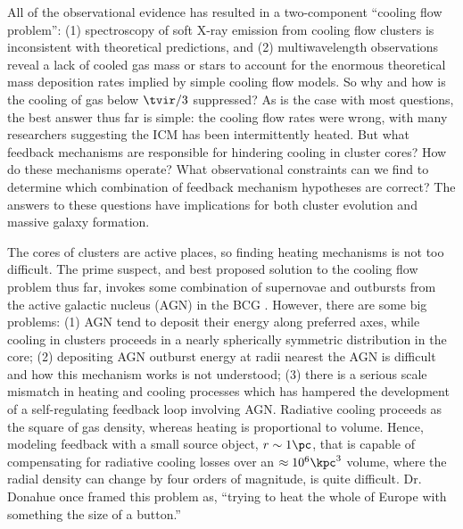 All of the observational evidence has resulted in a two-component
``cooling flow problem'': (1) spectroscopy of soft X-ray emission from
cooling flow clusters is inconsistent with theoretical predictions,
and (2) multiwavelength observations reveal a lack of cooled gas mass
or stars to account for the enormous theoretical mass deposition rates
implied by simple cooling flow models. So why and how is the cooling
of gas below $\tvir/3$ suppressed? As is the case with most questions,
the best answer thus far is simple: the cooling flow rates were wrong,
with many researchers suggesting the ICM has been intermittently
heated. But what feedback mechanisms are responsible for hindering
cooling in cluster cores?  How do these mechanisms operate?  What
observational constraints can we find to determine which combination
of feedback mechanism hypotheses are correct? The answers to these
questions have implications for both cluster evolution and massive
galaxy formation.

The cores of clusters are active places, so finding heating mechanisms
is not too difficult. The prime suspect, and best proposed solution to
the cooling flow problem thus far, invokes some combination of
supernovae and outbursts from the active galactic nucleus (AGN) in the
BCG \citep{1995MNRAS.276..663B, 1997MNRAS.288..355B,
2000ApJ...532...17L, 2001Natur.414..425V, 2002MNRAS.332..729C,
2002Natur.418..301B, 2002MNRAS.331..545B, 2002MNRAS.333..145N,
2002ApJ...581..223R, 2002MNRAS.335..610A, 2004MNRAS.348.1105O,
2004ApJ...613..811M, 2004ApJ...615..681R, 2004ApJ...617..896H,
2004MNRAS.355..995D, 2005ApJ...622..847S, pizzolato05, agnframework,
2006ApJ...643..120B, 2006ApJ...638..659M}. However, there are some big
problems: (1) AGN tend to deposit their energy along preferred axes,
while cooling in clusters proceeds in a nearly spherically symmetric
distribution in the core; (2) depositing AGN outburst energy at radii
nearest the AGN is difficult and how this mechanism works is not
understood; (3) there is a serious scale mismatch in heating and
cooling processes which has hampered the development of a
self-regulating feedback loop involving AGN. Radiative cooling
proceeds as the square of gas density, whereas heating is proportional
to volume. Hence, modeling feedback with a small source object, $r
\sim 1 \pc$, that is capable of compensating for radiative cooling
losses over an $\approx 10^6 \kpc^3$ volume, where the radial density
can change by four orders of magnitude, is quite
difficult. Dr. Donahue once framed this problem as, ``trying to heat
the whole of Europe with something the size of a button.''

